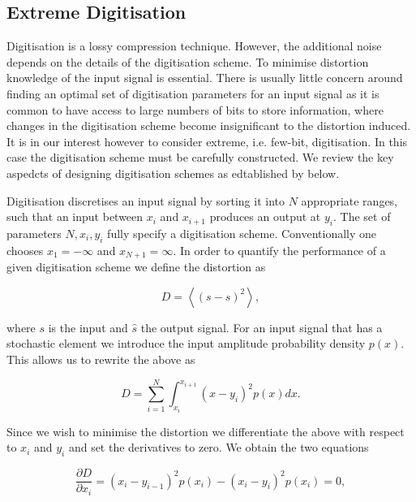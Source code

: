 \documentclass[apj]{emulateapj}
\begin{document}
\subsection{Extreme Digitisation}
\label{subsec:extremedigitisation}

Digitisation is a lossy compression technique. However, the additional noise depends on the details of the digitisation scheme. To minimise distortion knowledge of the input signal is essential. There is usually little concern around finding an optimal set of digitisation parameters for an input signal as it is common to have access to large numbers of bits to store information, where changes in the digitisation scheme become insignificant to the distortion induced. It is in our interest however to consider extreme, i.e. few-bit, digitisation. In this case the digitisation scheme must be carefully constructed. We review the key aspedcts of designing digitisation schemes as edtablished by \cite{max1960} below.

Digitisation discretises an input signal by sorting it into $N$ appropriate ranges, such that an input between $x_i$ and $x_{i+1}$ produces an output at $y_i$. The set of parameters $N, x_i, y_i$ fully specify a digitisation scheme. Conventionally one chooses $x_{1} = -\infty$ and $x_{N+1} = \infty$. In order to quantify the performance of a given digitisation scheme we define the distortion as

\begin{equation} D = \left\langle  \left( s - \hat{s} \right)^2 \right\rangle, \end{equation}

where $s$ is the input and $\hat{s}$ the output signal. For an input signal that has a stochastic element we introduce the input amplitude probability density $p(x)$. This allows us to rewrite the above as

\begin{equation} D = \sum_{i = 1}^N \int_{x_i}^{x_{i+1}} \left(x-y_i\right)^2 p(x) dx. \end{equation}

Since we wish to minimise the distortion we differentiate the above with respect to $x_i$ and $y_i$ and set the derivatives to zero. We obtain the two equations

\begin{equation} \label{eq:distderiv1}
\frac{\partial D}{\partial x_i} = \left(x_i-y_{i-1}\right)^2 p(x_i) - \left(x_i - y_i\right)^2 p(x_i) = 0,
\end{equation}
\end{document}
